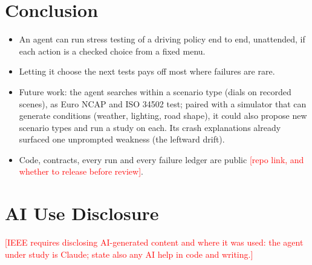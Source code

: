\documentclass[conference]{IEEEtran}
\newcommand{\pending}[1]{\textcolor{red}{[#1]}}
\begin{document}
\section{Conclusion}\label{sec:conclusion}
\begin{itemize}
\item An agent can run stress testing of a driving policy end to end, unattended, if each action is a checked choice from a fixed menu.
\item Letting it choose the next tests pays off most where failures are rare.
\item Future work: the agent searches within a scenario type (dials on recorded scenes), as Euro NCAP and ISO 34502 test; paired with a simulator that can generate conditions (weather, lighting, road shape), it could also propose new scenario types and run a study on each. Its crash explanations already surfaced one unprompted weakness (the leftward drift).
\item Code, contracts, every run and every failure ledger are public \pending{repo link, and whether to release before review}.
\end{itemize}

\section*{AI Use Disclosure}
\pending{IEEE requires disclosing AI-generated content and where it was used: the agent under study is Claude; state also any AI help in code and writing.}



\end{document}
